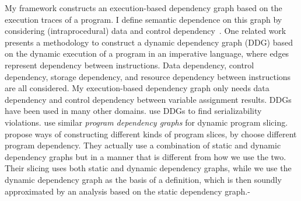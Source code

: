 My framework constructs an execution-based dependency graph based on the execution traces of a program. 
    I define semantic dependence on this graph by considering (intraprocedural) data and control 
    dependency~\cite{bilardi1996framework,cytron1991efficiently,pollock1989incremental}.    
    One related work  
    \cite{austin1992dynamic} presents a methodology to construct a dynamic dependency graph (DDG) based on the dynamic execution of a program in an imperative language, where edges represent dependency between instructions. Data dependency, control dependency, storage dependency, and resource dependency between instructions are all considered. My execution-based dependency graph only needs data dependency and control dependency between variable assignment results. 
    DDGs have been used in many other domains. \cite{nagar2018automated} use DDGs to find serializability violations. \cite{hammer2006dynamic} use similar \emph{program dependency graphs} \cite{ferrante1987program} for dynamic program slicing.
    \cite{mastroeni2008data} propose ways of constructing different kinds of program slices, by choose different program dependency. 
    They actually use a combination of  
    static and dynamic dependency graphs but in a manner that is different from how we use the two. Their slicing uses both static and dynamic dependency graphs, while we use the dynamic dependency graph as the basis of a definition, which is then soundly approximated by an analysis based on the static dependency graph.-
    
